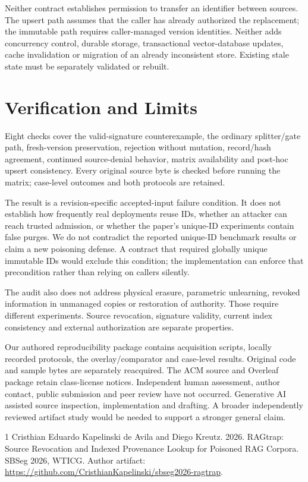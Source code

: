 \documentclass[sigconf,nonacm]{acmart}
\begin{document}
Neither contract establishes permission to transfer an identifier between sources. The upsert path assumes that the caller has already authorized the replacement; the immutable path requires caller-managed version identities. Neither adds concurrency control, durable storage, transactional vector-database updates, cache invalidation or migration of an already inconsistent store. Existing stale state must be separately validated or rebuilt.

\section{Verification and Limits}
Eight checks cover the valid-signature counterexample, the ordinary splitter/gate path, fresh-version preservation, rejection without mutation, record/hash agreement, continued source-denial behavior, matrix availability and post-hoc upsert consistency. Every original source byte is checked before running the matrix; case-level outcomes and both protocols are retained.

The result is a revision-specific accepted-input failure condition. It does not establish how frequently real deployments reuse IDs, whether an attacker can reach trusted admission, or whether the paper's unique-ID experiments contain false purges. We do not contradict the reported unique-ID benchmark results or claim a new poisoning defense. A contract that required globally unique immutable IDs would exclude this condition; the implementation can enforce that precondition rather than relying on callers silently.

The audit also does not address physical erasure, parametric unlearning, revoked information in unmanaged copies or restoration of authority. Those require different experiments. Source revocation, signature validity, current index consistency and external authorization are separate properties.

Our authored reproducibility package contains acquisition scripts, locally recorded protocols, the overlay/comparator and case-level results. Original code and sample bytes are separately reacquired. The ACM source and Overleaf package retain class-license notices. Independent human assessment, author contact, public submission and peer review have not occurred. Generative AI assisted source inspection, implementation and drafting. A broader independently reviewed artifact study would be needed to support a stronger general claim.

\begin{thebibliography}{1}
 Cristhian Eduardo Kapelinski de Avila and Diego Kreutz. 2026. RAGtrap: Source Revocation and Indexed Provenance Lookup for Poisoned RAG Corpora. SBSeg 2026, WTICG. Author artifact: \url{https://github.com/CristhianKapelinski/sbseg2026-ragtrap}.
\end{thebibliography}
\end{document}
